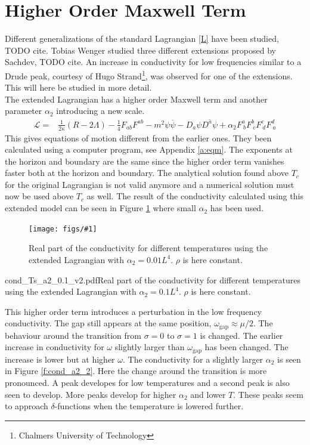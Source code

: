 \documentclass[12pt]{report}
\newcommand{\fig}[3]{
\begin{figure}
\centering
\texttt{[image: figs/\#1]}
\caption{#2}
\end{figure}
}
\begin{document}
\section{Higher Order Maxwell Term}
Different generalizations of the standard Lagrangian \eqref{L} have been studied, TODO cite. Tobias Wenger studied three different extensions proposed by Sachdev, TODO cite. An increase in conductivity for low frequencies similar to a Drude peak, courtesy of Hugo Strand\footnote{Chalmers University of Technology}, was observed for one of the extensions. This will here be studied in more detail.\\
The extended Lagrangian has a higher order Maxwell term and another parameter $\alpha_2$ introducing a new scale.
\begin{eqnarray}
 \mathcal{L}=&\frac{1}{2\kappa}\left(R-2\Lambda\right)-\frac{1}{4}F_{ab}F^{ab}-m^2\psi\overline{\psi}-D_a\psi\overline{D^a\psi}
+\alpha_2F^a_{\ b}F^b_{\ c}F^c_{\ d}F^d_{\ a}\label{L2}
\end{eqnarray}
This gives equations of motion different from the earlier ones. They been calculated using a computer program, see Appendix \ref{a:eqm}. The exponents at the horizon and boundary are the same since the higher order term vanishes faster both at the horizon and boundary. The analytical solution found above $T_c$ for the original Lagrangian is not valid anymore and a numerical solution must now be used above $T_c$ as well. The result of the conductivity calculated using this extended model can be seen in Figure \ref{f:cond_a2_1} where  small $\alpha_2$ has been used.

\fig{cond_Ts_a2_0.01_v2.pdf}{Real part of the conductivity for different temperatures using the extended Lagrangian with $\alpha_2=0.01L^4$. $\rho$ is here constant.\label{f:cond_a2_1}}

\fig{cond_Ts_a2_0.1_v2.pdf}{Real part of the conductivity for different temperatures using the extended Lagrangian with $\alpha_2=0.1L^4$. $\rho$ is here constant.\label{f:cond_a2_2}}

This higher order term introduces a perturbation in the low frequency conductivity. The gap still appears at the same position, $\omega_\mathrm{gap}\approx\mu/2$. The behaviour around the transition from $\sigma=0$ to $\sigma=1$ is changed. The earlier increase in conductivity for $\omega$ slightly larger than $\omega_\mathrm{gap}$ has been changed. The increase is lower but at higher $\omega$. The conductivity for a slightly larger $\alpha_2$ is seen in Figure \ref{f:cond_a2_2}. Here the change around the transition is more pronounced. A peak developes for low temperatures and a second peak is also seen to develop. More peaks develop for higher $\alpha_2$ and lower $T$. These peaks seem to approach $\delta$-functions when the temperature is lowered further.\\
\end{document}
